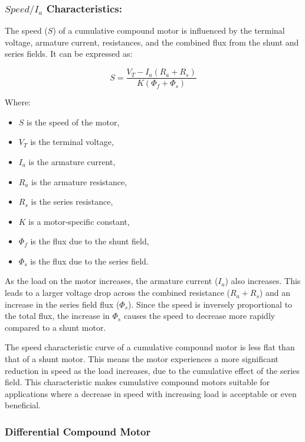 \documentclass[a4paper,12pt]{article}
\begin{document}
			\subsubsection{$Speed / I_a$ Characteristics:}
			
			The speed (\(S\)) of a cumulative compound motor is influenced by the terminal voltage, armature current, resistances, and the combined flux from the shunt and series fields. It can be expressed as:
			
			\begin{equation}
				S = \frac{V_T - I_a (R_a + R_s)}{K (\Phi_f + \Phi_s)}
			\end{equation}
			
			Where:
			\begin{itemize}
				\item \(S\) is the speed of the motor,
				\item \(V_T\) is the terminal voltage,
				\item \(I_a\) is the armature current,
				\item \(R_a\) is the armature resistance,
				\item \(R_s\) is the series resistance,
				\item \(K\) is a motor-specific constant,
				\item \(\Phi_f\) is the flux due to the shunt field,
				\item \(\Phi_s\) is the flux due to the series field.
			\end{itemize}
			
			As the load on the motor increases, the armature current (\(I_a\)) also increases. This leads to a larger voltage drop across the combined resistance (\(R_a + R_s\)) and an increase in the series field flux (\(\Phi_s\)). Since the speed is inversely proportional to the total flux, the increase in \(\Phi_s\) causes the speed to decrease more rapidly compared to a shunt motor.
			
			The speed characteristic curve of a cumulative compound motor is less flat than that of a shunt motor. This means the motor experiences a more significant reduction in speed as the load increases, due to the cumulative effect of the series field. This characteristic makes cumulative compound motors suitable for applications where a decrease in speed with increasing load is acceptable or even beneficial.
			
			
			
			\subsubsection{Differential Compound Motor}
\end{document}
